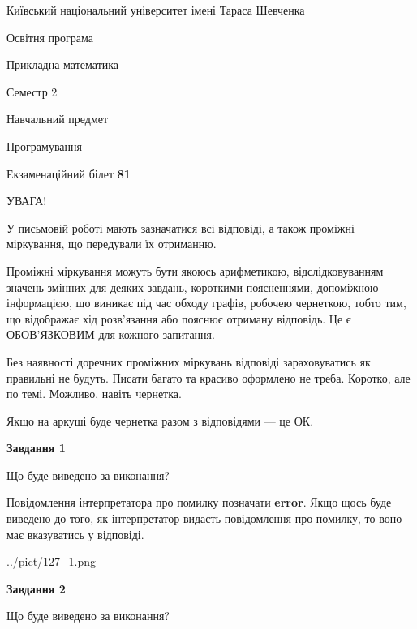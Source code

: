 \documentclass[12pt, ukrainian]{article}
\begin{document}
{{\begin {small}\par
{ \center  Київський національний університет імені Тараса Шевченка \par}
{\parbox {5 cm}{Освітня програма \hfill}{\parbox {7 cm}{Прикладна математика \hfill}}\parbox {6 cm}{\hfill Семестр 2}}\par
{\parbox {5 cm} {Навчальний предмет \hfill}\parbox {7 cm}{Програмування \hfill}\parbox {6cm}{\hfill}\par}\vspace{-7pt} \end{small}}{\center Екзаменаційний білет \No \textbf
{ 81 }\par}}
{
\begin {large}
УВАГА!

У письмовій роботі мають зазначатися всі відповіді, а також проміжні міркування, що передували їх отриманню.

Проміжні міркування можуть бути якоюсь арифметикою, відслідковуванням зна\-чень змінних для деяких завдань,
короткими поясненнями, допоміжною інформацією, що виникає під час обходу графів, робочею чернеткою,
тобто тим, що відображає хід розв’язання або пояснює отриману відповідь.
Це є ОБОВ’ЯЗКОВИМ для кожного запитання.

Без наявності доречних проміжних міркувань відповіді зараховуватись як правиль\-ні не будуть.
Писати багато та красиво оформлено не треба. Коротко, але по темі. Можли\-во, навіть чернетка.

Якщо на аркуші буде чернетка разом з відповідями --- це ОК.

\newpage

{\begin {center}\textbf{Завдання 1}\end {center}}\par
Що буде виведено за виконання?

Повідомлення інтерпретатора про помилку позначати \textbf{error}.
Якщо щось буде виведено до того, як інтерпретатор видасть повідомлення про помилку, 
то воно має вказуватись у відповіді. \par


\begin{center}
	{../pict/127_1.png}
\end{center}
\newpage

{\begin {center}\textbf{Завдання 2}\end {center}}\par
Що буде виведено за виконання?


\end{large}}
\end{document}
